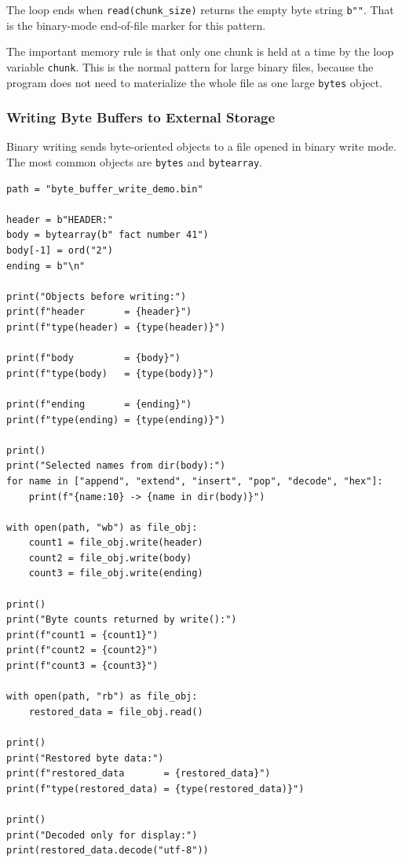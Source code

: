 The loop ends when \texttt{read(chunk\_size)} returns the empty byte string \texttt{b""}. That is the binary-mode end-of-file marker for this pattern.

The important memory rule is that only one chunk is held at a time by the loop variable \texttt{chunk}. This is the normal pattern for large binary files, because the program does not need to materialize the whole file as one large \texttt{bytes} object.

\subsubsection{Writing Byte Buffers to External Storage}

Binary writing sends byte-oriented objects to a file opened in binary write mode. The most common objects are \texttt{bytes} and \texttt{bytearray}.

\begin{verbatim}
path = "byte_buffer_write_demo.bin"

header = b"HEADER:"
body = bytearray(b" fact number 41")
body[-1] = ord("2")
ending = b"\n"

print("Objects before writing:")
print(f"header       = {header}")
print(f"type(header) = {type(header)}")

print(f"body         = {body}")
print(f"type(body)   = {type(body)}")

print(f"ending       = {ending}")
print(f"type(ending) = {type(ending)}")

print()
print("Selected names from dir(body):")
for name in ["append", "extend", "insert", "pop", "decode", "hex"]:
    print(f"{name:10} -> {name in dir(body)}")

with open(path, "wb") as file_obj:
    count1 = file_obj.write(header)
    count2 = file_obj.write(body)
    count3 = file_obj.write(ending)

print()
print("Byte counts returned by write():")
print(f"count1 = {count1}")
print(f"count2 = {count2}")
print(f"count3 = {count3}")

with open(path, "rb") as file_obj:
    restored_data = file_obj.read()

print()
print("Restored byte data:")
print(f"restored_data       = {restored_data}")
print(f"type(restored_data) = {type(restored_data)}")

print()
print("Decoded only for display:")
print(restored_data.decode("utf-8"))
\end{verbatim}


